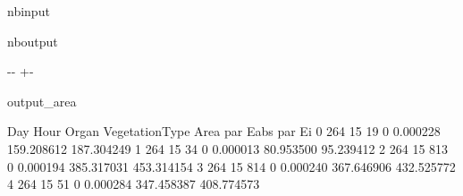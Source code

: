 \documentclass[letterpaper,10pt,english]{sphinxmanual}
\begin{document}
\begin{sphinxuseclass}{nbinput}
{
\begin{sphinxVerbatim}[commandchars=\\\{\}]
\llap{\color{nbsphinxin}[18]:\,\hspace{\fboxrule}\hspace{\fboxsep}}  
     \PYG{p}{[}\PYG{p}{]}
   
  
              
             
              
\end{sphinxVerbatim}
}

\end{sphinxuseclass}
\begin{sphinxuseclass}{nboutput}
{

\kern-\sphinxverbatimsmallskipamount\kern-\baselineskip
\kern+\FrameHeightAdjust\kern-\fboxrule
\vspace{\nbsphinxcodecellspacing}

\begin{sphinxuseclass}{output_area}
\begin{sphinxuseclass}{}


\begin{sphinxVerbatim}[commandchars=\\\{\}]
   Day  Hour  Organ  VegetationType      Area    par Eabs      par Ei
0  264    15     19               0  0.000228  159.208612  187.304249
1  264    15     34               0  0.000013   80.953500   95.239412
2  264    15    813               0  0.000194  385.317031  453.314154
3  264    15    814               0  0.000240  367.646906  432.525772
4  264    15     51               0  0.000284  347.458387  408.774573
\end{sphinxVerbatim}



\end{sphinxuseclass}
\end{sphinxuseclass}
}

\end{sphinxuseclass}
\end{document}
